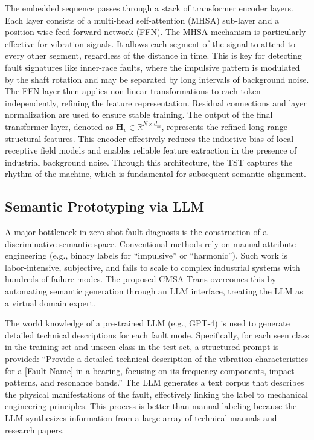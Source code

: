 \documentclass[journal]{IEEEtran}
\begin{document}
The embedded sequence passes through a stack of transformer encoder layers. Each layer consists of a multi-head self-attention (MHSA) sub-layer and a position-wise feed-forward network (FFN). The MHSA mechanism is particularly effective for vibration signals. It allows each segment of the signal to attend to every other segment, regardless of the distance in time. This is key for detecting fault signatures like inner-race faults, where the impulsive pattern is modulated by the shaft rotation and may be separated by long intervals of background noise. The FFN layer then applies non-linear transformations to each token independently, refining the feature representation. Residual connections and layer normalization are used to ensure stable training. The output of the final transformer layer, denoted as $\mathbf{H}_v \in \mathbb{R}^{N \times d_m}$, represents the refined long-range structural features. This encoder effectively reduces the inductive bias of local-receptive field models and enables reliable feature extraction in the presence of industrial background noise. Through this architecture, the TST captures the rhythm of the machine, which is fundamental for subsequent semantic alignment.

\subsection{Semantic Prototyping via LLM}

A major bottleneck in zero-shot fault diagnosis is the construction of a discriminative semantic space. Conventional methods rely on manual attribute engineering (e.g., binary labels for ``impulsive'' or ``harmonic''). Such work is labor-intensive, subjective, and fails to scale to complex industrial systems with hundreds of failure modes. The proposed CMSA-Trans overcomes this by automating semantic generation through an LLM interface, treating the LLM as a virtual domain expert.

The world knowledge of a pre-trained LLM (e.g., GPT-4) is used to generate detailed technical descriptions for each fault mode. Specifically, for each seen class in the training set and unseen class in the test set, a structured prompt is provided: ``Provide a detailed technical description of the vibration characteristics for a [Fault Name] in a bearing, focusing on its frequency components, impact patterns, and resonance bands.'' The LLM generates a text corpus that describes the physical manifestations of the fault, effectively linking the label to mechanical engineering principles. This process is better than manual labeling because the LLM synthesizes information from a large array of technical manuals and research papers.
\end{document}
